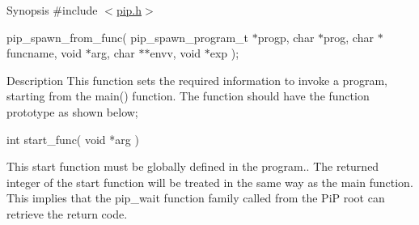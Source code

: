 \begin{DoxyParagraph}{Synopsis}
\#include $<$\hyperlink{pip_8h_source}{pip.\-h}$>$ \par
pip\-\_\-spawn\-\_\-from\-\_\-func( pip\-\_\-spawn\-\_\-program\-\_\-t $\ast$progp, char $\ast$prog, char $\ast$funcname, void $\ast$arg, char $\ast$$\ast$envv, void $\ast$exp );
\end{DoxyParagraph}
\begin{DoxyParagraph}{Description}
This function sets the required information to invoke a program, starting from the {\ttfamily main()} function. The function should have the function prototype as shown below; 
\begin{DoxyCode}
\textcolor{keywordtype}{int} start\_func( \textcolor{keywordtype}{void} *arg )
\end{DoxyCode}
 This start function must be globally defined in the program.. The returned integer of the start function will be treated in the same way as the {\ttfamily main} function. This implies that the {\ttfamily pip\-\_\-wait} function family called from the Pi\-P root can retrieve the return code.
\end{DoxyParagraph}

